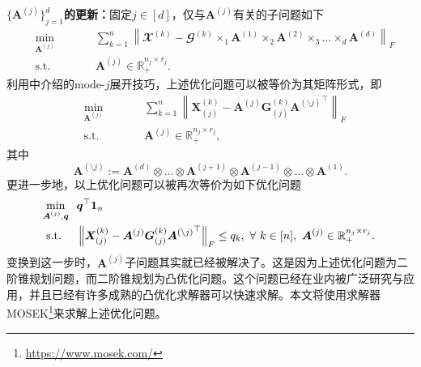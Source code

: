 \textbf{$\{\boldsymbol{A}^{(j)}\}_{j=1}^{d}$的更新：}固定$j\in[d]$，仅与$\boldsymbol{A}^{(j)}$有关的子问题如下
\begin{equation*}
\begin{aligned}
    &\underset{\boldsymbol{A}^{(j)}}{\min}\qquad&& \sum_{k=1}^{n}\left\|\mathbfcal{X}^{(k)}-\mathbfcal{G}^{(k)} \times_{1} \boldsymbol{A}^{(1)} \times_{2} \boldsymbol{A}^{(2)}\times_{3}\ldots \times_{d} \boldsymbol{A}^{(d)}\right\|_{F} \\ &\text{s.t. }&& \boldsymbol{A}^{(j)}\in \mathbb{R}_{+}^{n_j \times r_j}.
\end{aligned}
\end{equation*}
利用中介绍的mode-$j$展开技巧，上述优化问题可以被等价为其矩阵形式，即
\begin{equation}\label{eq:l1-socp}
\begin{aligned}
    &\underset{\boldsymbol{A}^{(j)}}{\min}\qquad&& \sum_{k=1}^{n}\left\|\boldsymbol{X}^{(k)}_{(j)}  - \boldsymbol{A}^{(j)} \boldsymbol{G}^{(k)}_{(j)} {\boldsymbol{A}^{(\setminus j)}}^{\top} \right\|_{F} \\ &\text{s.t. }&& \boldsymbol{A}^{(j)}\in \mathbb{R}_{+}^{n_j \times r_j},
\end{aligned}
\end{equation}
其中
\begin{equation*}
    \boldsymbol{A}^{(\setminus j)} := \boldsymbol{A}^{(d)} \otimes \ldots \otimes \boldsymbol{A}^{(j+1)} \otimes \boldsymbol{A}^{(j-1)} \otimes \ldots \otimes \boldsymbol{A}^{(1)}.
\end{equation*}
更进一步地，以上优化问题可以被再次等价为如下优化问题
\begin{equation*}
    \begin{aligned}
    &\underset{\mathclap{\boldsymbol{A}^{(j)},\boldsymbol{q}}}{\min} && \boldsymbol{q}^{\top}\boldsymbol{1}_{n} \\
    &\text{s.t.} && \left\|\boldsymbol{X}^{(k)}_{(j)}- \boldsymbol{A}^{(j)} \boldsymbol{G}^{(k)}_{(j)} {\boldsymbol{A}^{(\setminus j)}}^{\top}\right\|_{F} \leq q_{k},~\forall~ k\in[n],~\boldsymbol{A}^{(j)} \in \mathbb{R}_{+}^{n_j \times r_j}.
    \end{aligned}
\end{equation*}
变换到这一步时，$\boldsymbol{A}^{(j)}$子问题其实就已经被解决了。这是因为上述优化问题为二阶锥规划问题，而二阶锥规划为凸优化问题。这个问题已经在业内被广泛研究与应用，并且已经有许多成熟的凸优化求解器可以快速求解。本文将使用求解器MOSEK\footnote{\url{https://www.mosek.com/}}来求解上述优化问题。

